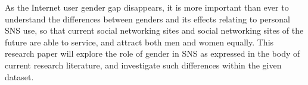 As the Internet user gender gap disappears, it is more important than ever to understand the differences between genders and its effects relating to personal SNS use, so that current social networking sites and social networking sites of the future are able to service, and attract both men and women equally. This research paper
will explore the role of gender in SNS as expressed in the body of current research literature, and investigate such differences within the given dataset.


